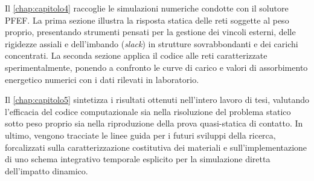 \documentclass[12pt,a4paper]{report}
\numberwithin{figure}{chapter}
\numberwithin{table}{chapter}
\begin{document}
Il \cref{chap:capitolo4} raccoglie le simulazioni numeriche condotte con il solutore PFEF. La prima sezione illustra la risposta statica delle reti soggette al peso proprio, presentando strumenti pensati per la gestione dei vincoli esterni, delle rigidezze assiali e dell'imbando (\textit{slack}) in strutture sovrabbondanti e dei carichi concentrati. La seconda sezione applica il codice alle reti caratterizzate sperimentalmente, ponendo a confronto le curve di carico e valori di assorbimento energetico numerici con i dati rilevati in laboratorio. 

Il \cref{chap:capitolo5} sintetizza i risultati ottenuti nell'intero lavoro di tesi, valutando l'efficacia del codice computazionale sia nella risoluzione del problema statico sotto peso proprio sia nella riproduzione della prova quasi-statica di contatto. In ultimo, vengono tracciate le linee guida per i futuri sviluppi della ricerca, forcalizzati sulla caratterizzazione costitutiva dei materiali e sull'implementazione di uno schema integrativo temporale esplicito per la simulazione diretta dell'impatto dinamico. 

\newpage
\thispagestyle{empty}
\mbox{}
\newpage


\newpage
\thispagestyle{empty}
\mbox{}
\newpage


\newpage
\thispagestyle{empty}
\mbox{}
\newpage


\newpage
\thispagestyle{empty}
\mbox{}
\newpage


\newpage
\thispagestyle{empty}
\mbox{}
\newpage


\newpage
\thispagestyle{empty}
\mbox{}
\newpage

\appendix


\printbibliography
\end{document}
